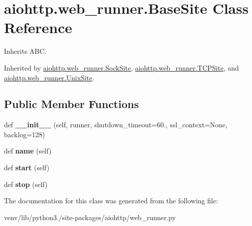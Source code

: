 \hypertarget{classaiohttp_1_1web__runner_1_1_base_site}{}\section{aiohttp.\+web\+\_\+runner.\+Base\+Site Class Reference}
\label{classaiohttp_1_1web__runner_1_1_base_site}


Inherits A\+BC.



Inherited by \hyperlink{classaiohttp_1_1web__runner_1_1_sock_site}{aiohttp.\+web\+\_\+runner.\+Sock\+Site}, \hyperlink{classaiohttp_1_1web__runner_1_1_t_c_p_site}{aiohttp.\+web\+\_\+runner.\+T\+C\+P\+Site}, and \hyperlink{classaiohttp_1_1web__runner_1_1_unix_site}{aiohttp.\+web\+\_\+runner.\+Unix\+Site}.

\subsection*{Public Member Functions}
\begin{DoxyCompactItemize}
\item 
\mbox{\label{classaiohttp_1_1web__runner_1_1_base_site_ab058b7bdaf9ca187daa3eab779b857b8}} 
def {\bfseries \+\_\+\+\_\+init\+\_\+\+\_\+} (self, runner, shutdown\+\_\+timeout=60., ssl\+\_\+context=None, backlog=128)
\item 
\mbox{\label{classaiohttp_1_1web__runner_1_1_base_site_af773376b2207d78a7aacf181526bd833}} 
def {\bfseries name} (self)
\item 
\mbox{\label{classaiohttp_1_1web__runner_1_1_base_site_aa6ad267d5b3a940c184ba8f1e54c6946}} 
def {\bfseries start} (self)
\item 
\mbox{\label{classaiohttp_1_1web__runner_1_1_base_site_a61265065bcb13b21b8c7620d6ad886ed}} 
def {\bfseries stop} (self)
\end{DoxyCompactItemize}


The documentation for this class was generated from the following file\+:\begin{DoxyCompactItemize}
\item 
venv/lib/python3./site-\/packages/aiohttp/web\+\_\+runner.\+py\end{DoxyCompactItemize}

